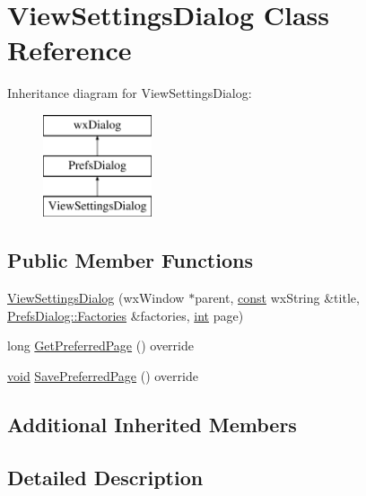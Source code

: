\hypertarget{class_view_settings_dialog}{}\section{View\+Settings\+Dialog Class Reference}
\label{class_view_settings_dialog}
Inheritance diagram for View\+Settings\+Dialog\+:\begin{figure}[H]
\begin{center}
\leavevmode
\includegraphics[height=3.000000cm]{class_view_settings_dialog}
\end{center}
\end{figure}
\subsection*{Public Member Functions}
\begin{DoxyCompactItemize}
\item 
\hyperlink{class_view_settings_dialog_a181c123cc1bf06558bcd6e870f134016}{View\+Settings\+Dialog} (wx\+Window $\ast$parent, \hyperlink{getopt1_8c_a2c212835823e3c54a8ab6d95c652660e}{const} wx\+String \&title, \hyperlink{class_prefs_dialog_abce19159c638bc50c25147e479275388}{Prefs\+Dialog\+::\+Factories} \&factories, \hyperlink{xmltok_8h_a5a0d4a5641ce434f1d23533f2b2e6653}{int} page)
\item 
long \hyperlink{class_view_settings_dialog_ad17041faf76af9d8248af939ecc8b002}{Get\+Preferred\+Page} () override
\item 
\hyperlink{sound_8c_ae35f5844602719cf66324f4de2a658b3}{void} \hyperlink{class_view_settings_dialog_ab135e1036ba5678aeb5137a2c64fcf6a}{Save\+Preferred\+Page} () override
\end{DoxyCompactItemize}
\subsection*{Additional Inherited Members}


\subsection{Detailed Description}


